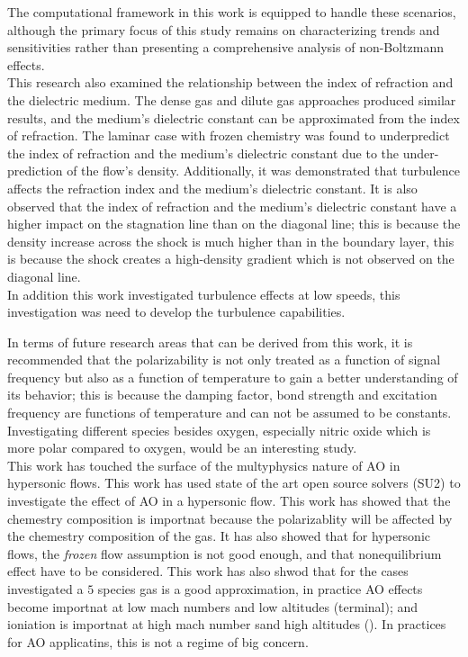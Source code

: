 The computational framework in this work is equipped to handle these scenarios,
although the primary focus of this study remains on characterizing trends and
sensitivities rather than presenting a comprehensive analysis of non-Boltzmann
effects. \\

This research also examined the relationship between the index of refraction
and the dielectric medium. The dense gas and dilute gas approaches produced
similar results, and the medium's dielectric constant can be approximated from
the index of refraction. The laminar case with frozen chemistry was found to
underpredict the index of refraction and the medium's dielectric constant due
to the under-prediction of the flow's density. Additionally, it was
demonstrated that turbulence affects the refraction index and the medium's
dielectric constant. It is also observed that the index of refraction and the
medium's dielectric constant have a higher impact on the stagnation line than
on the diagonal line; this is because the density increase across the shock is
much higher than in the boundary layer, this is because the shock creates a
high-density gradient which is not observed on the diagonal line. \\

In addition this work investigated turbulence effects at low speeds, this
investigation was need to develop the turbulence capabilities. 



In terms of future research areas that can be derived from this work, it is
recommended that the polarizability is not only treated as a function of signal
frequency but also as a function of temperature to gain a better understanding
of its behavior; this is because the damping factor, bond strength and
excitation frequency are functions of temperature and can not be assumed to be
constants.  \\

Investigating different species besides oxygen, especially nitric oxide which
is more polar compared to oxygen, would be an interesting study.  \\





This work has touched the surface of the multyphysics nature of \gls{AO} in
hypersonic flows. This work has used state of the art open source solvers (SU2)
to investigate the effect of \gls{AO} in a hypersonic flow. This work has
showed that the chemestry composition is importnat because the polarizablity
will be affected by the chemestry composition of the gas. It has also showed
that for hypersonic flows, the \textit{frozen} flow assumption is not good
enough, and that nonequilibrium effect have to be considered. This work has
also shwod that for the cases investigated a $5$ species gas is a good
approximation, in practice \gls{AO} effects become importnat at low mach
numbers and low altitudes (terminal); and ioniation is importnat at high mach
number sand high altitudes (). In practices
for \gls{AO} applicatins, this is not a regime of big concern. 

